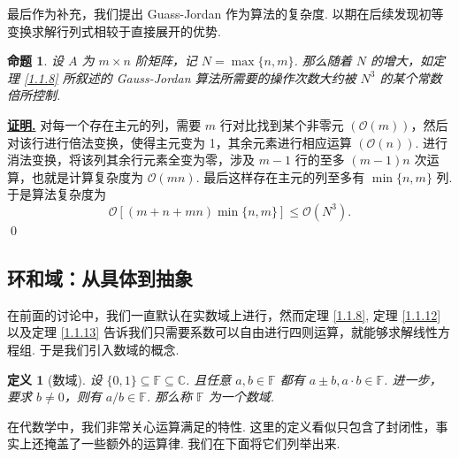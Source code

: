 \documentclass[10pt,openany]{article}
\theoremstyle{thmstyle} %
\theoremstyle{defstyle} %
\newtheorem{definition}[theorem]{定义}
\theoremstyle{prostyle} %
\newtheorem{proposition}[theorem]{命题}
\theoremstyle{exastyle}
\theoremstyle{remstyle}
\renewenvironment{proof}[1][证明]{\par\underline{\textbf{#1.}} \;\fangsong}{\qed\par}
\newcommand{\F}{\mathbb{F}}
\begin{document}
最后作为补充，我们提出 Guass-Jordan 作为算法的复杂度. 以期在后续发现初等变换求解行列式相较于直接展开的优势.

\begin{proposition}
	设 \( A \) 为 \( m \times n \) 阶矩阵，记 \( N=\max\{n,m\} \). 那么随着 \( N \) 的增大，如定理 \ref{1.1.8} 所叙述的 Gauss-Jordan 算法所需要的操作次数大约被 \( N^3 \) 的某个常数倍所控制. 
\end{proposition}

\begin{proof}
	对每一个存在主元的列，需要 \( m \) 行对比找到某个非零元 \( (\mathcal{O}(m)) \)，然后对该行进行倍法变换，使得主元变为 1，其余元素进行相应运算 \( (\mathcal{O}(n)) \). 进行消法变换，将该列其余行元素全变为零，涉及 \( m-1 \) 行的至多 \( (m-1)n \) 次运算，也就是计算复杂度为 \( \mathcal{O}(mn) \). 最后这样存在主元的列至多有 \( \min\{n,m\} \) 列. 于是算法复杂度为
	\[ \mathcal{O}[(m+n+mn)\min\{n,m\}] \leq \mathcal{O}(N^3). \] 
\end{proof}

\subsection{环和域：从具体到抽象}

在前面的讨论中，我们一直默认在实数域上进行，然而定理 \ref{1.1.8}, 定理 \ref{1.1.12} 以及定理 \ref{1.1.13} 告诉我们只需要系数可以自由进行四则运算，就能够求解线性方程组. 于是我们引入数域的概念.

\begin{definition}[数域]
	设 \( \{0,1\} \subseteq \F \subseteq \mathbb{C} \). 且任意 \( a,b \in \F \) 都有 \( a \pm b, a \cdot b \in \F \). 进一步，要求 \( b \neq 0 \)，则有 \( a/b \in \F \). 那么称 \( \F \) 为一个数域.
	\label{1.2.1}
\end{definition}

在代数学中，我们非常关心运算满足的特性. 这里的定义看似只包含了封闭性，事实上还掩盖了一些额外的运算律. 我们在下面将它们列举出来.
\end{document}
